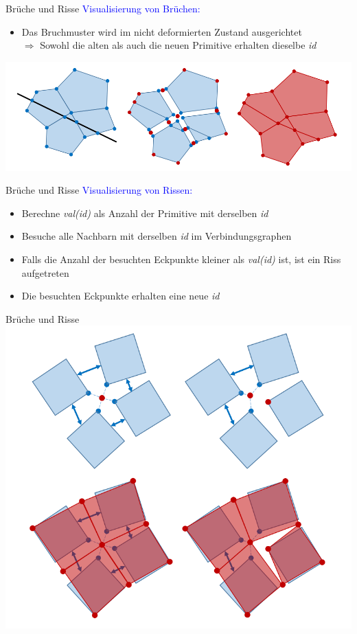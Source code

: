\documentclass[t]{beamer}
\begin{document}
	\begin{frame}{Brüche und Risse}
		\textcolor{blue}{Visualisierung von Brüchen:}
		\begin{itemize}
			\item Das Bruchmuster wird im nicht deformierten Zustand ausgerichtet\\
				$\Rightarrow$ Sowohl die alten als auch die neuen Primitive erhalten dieselbe \textit{id}
		\end{itemize}
		\begin{center}
			\includegraphics[scale = 0.4]{Fracture.png}
		\end{center}
	\end{frame}
	
	\begin{frame}{Brüche und Risse}
		\textcolor{blue}{Visualisierung von Rissen:}
		\begin{itemize}
			\item Berechne \textit{val(id)} als Anzahl der Primitive mit derselben \textit{id}
			\item Besuche alle Nachbarn mit derselben \textit{id} im Verbindungsgraphen
			\item Falls die Anzahl der besuchten Eckpunkte kleiner als \textit{val(id)} ist, ist ein Riss aufgetreten
			\item Die besuchten Eckpunkte erhalten eine neue \textit{id}
		\end{itemize}
	\end{frame}

	\begin{frame}{Brüche und Risse}
		\centering
		\includegraphics[scale = 0.35]{Tearing.png}
	\end{frame}
	
\end{document}
